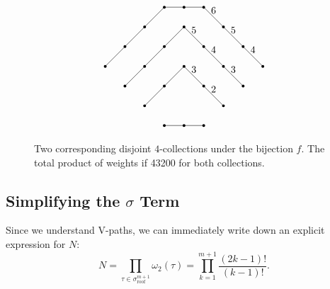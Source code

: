 \documentclass[11pt]{article}
\theoremstyle{mythm}
\begin{document}
\begin{figure}[h!]
\begin{equation*}
\begin{tikzpicture}[scale=0.70]
	\node at (3,1) [circle, fill, inner sep=1pt]{};
	\node at (4,1) [circle, fill, inner sep=1pt]{};
	\node at (5,1) [circle, fill, inner sep=1pt]{};
	\draw (3,1) -- (5,1);
	
	\node at (2,2) [circle, fill, inner sep=1pt]{};
	\node at (3,3) [circle, fill, inner sep=1pt]{};
	\node at (4,4) [circle, fill, inner sep=1pt]{};
	\node at (5,3) [circle, fill, inner sep=1pt]{};
	\node at (6,2) [circle, fill, inner sep=1pt]{};
	\draw (2,2) -- (3,3) -- (4,4);
	\draw (4,4) -- node[above] {3} (5,3);
	\draw (5,3) -- node[above] {2} (6,2);
	
	\node at (1,3) [circle, fill, inner sep=1pt]{};
	\node at (2,4) [circle, fill, inner sep=1pt]{};
	\node at (3,5) [circle, fill, inner sep=1pt]{};
	\node at (4,6) [circle, fill, inner sep=1pt]{};
	\node at (5,5) [circle, fill, inner sep=1pt]{};
	\node at (6,4) [circle, fill, inner sep=1pt]{};
	\node at (7,3) [circle, fill, inner sep=1pt]{};
	\draw (1,3) -- (2,4) -- (3,5) -- (4,6);
	\draw (4,6) -- node[above] {5} (5,5);
	\draw (5,5) -- node[above] {4} (6,4);
	\draw (6,4) -- node[above] {3} (7,3);
	
	\node at (0,4) [circle, fill, inner sep=1pt]{};
	\node at (1,5) [circle, fill, inner sep=1pt]{};
	\node at (2,6) [circle, fill, inner sep=1pt]{};
	\node at (3,7) [circle, fill, inner sep=1pt]{};
	\node at (4,7) [circle, fill, inner sep=1pt]{};
	\node at (5,7) [circle, fill, inner sep=1pt]{};
	\node at (6,6) [circle, fill, inner sep=1pt]{};
	\node at (7,5) [circle, fill, inner sep=1pt]{};
	\node at (8,4) [circle, fill, inner sep=1pt]{};
	\draw (0,4) -- (1,5) -- (2,6) -- (3,7) -- (4,7) -- (5,7);
	\draw (5,7) -- node[above] {6} (6,6);
	\draw (6,6) -- node[above] {5} (7,5);
	\draw (7,5) -- node[above] {4} (8,4);

\end{tikzpicture}
\end{equation*}
\caption{\label{fig:43200} Two corresponding disjoint $4$-collections under the bijection $f$. The total product of weights if 43200 for both collections.}
\end{figure}

\subsection{Simplifying the $\sigma$ Term}

Since we understand V-paths, we can immediately write down an explicit expression for $N$:
\begin{equation*}
N = \prod\limits_{\tau\in\sigma_{\text{roof}}^{m+1}}\omega_2(\tau) = \prod\limits_{k=1}^{m+1}\frac{(2k-1)!}{(k-1)!}.
\end{equation*}
\end{document}
